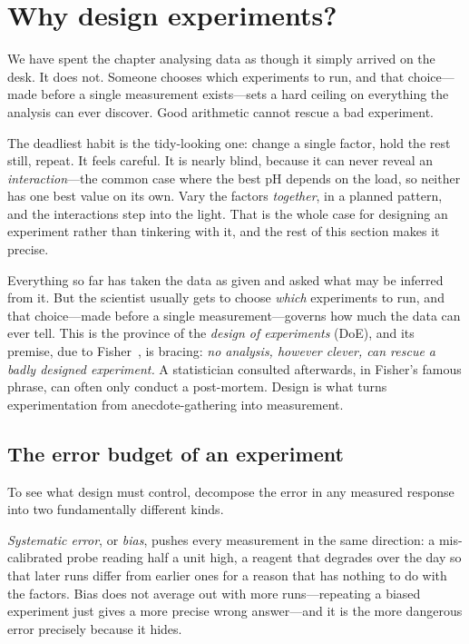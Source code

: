 \section{Why design experiments?}
\label{sec:stats-doe}

We have spent the chapter analysing data as though it simply arrived on the desk.
It does not. Someone chooses which experiments to run, and that choice---made
before a single measurement exists---sets a hard ceiling on everything the
analysis can ever discover. Good arithmetic cannot rescue a bad experiment.

The deadliest habit is the tidy-looking one: change a single factor, hold the
rest still, repeat. It feels careful. It is nearly blind, because it can never
reveal an \emph{interaction}---the common case where the best pH depends on the
load, so neither has one best value on its own. Vary the factors \emph{together},
in a planned pattern, and the interactions step into the light. That is the whole
case for designing an experiment rather than tinkering with it, and the rest of
this section makes it precise.

Everything so far has taken the data as given and asked what may be inferred from
it. But the scientist usually gets to choose \emph{which} experiments to run, and
that choice---made before a single measurement---governs how much the data can
ever tell. This is the province of the \emph{design of experiments} (DoE), and
its premise, due to Fisher~\cite{fisher}, is bracing: \emph{no analysis, however
clever, can rescue a badly designed experiment.} A statistician consulted afterwards, in
Fisher's famous phrase, can often only conduct a post-mortem. Design is what
turns experimentation from anecdote-gathering into measurement.

\subsection{The error budget of an experiment}

To see what design must control, decompose the error in any measured response
into two fundamentally different kinds.

\emph{Systematic error}, or \emph{bias}, pushes every measurement in the same
direction: a mis-calibrated probe reading half a unit high, a reagent that
degrades over the day so that later runs differ from earlier ones for a reason
that has nothing to do with the factors. Bias does not average out with more
runs---repeating a biased experiment just gives a more precise wrong answer---and
it is the more dangerous error precisely because it hides.

